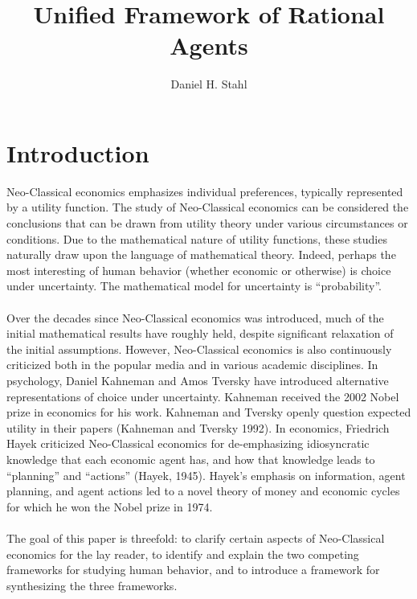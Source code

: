 \documentclass{article}
\theoremstyle{definition}
\begin{document}
	
	
\title{Unified Framework of Rational Agents}
\date{}
\author{Daniel H. Stahl}

\section{Introduction}

Neo-Classical economics emphasizes individual preferences, typically represented by a utility function.  The study of Neo-Classical economics can be considered the conclusions that can be drawn from utility theory under various circumstances or conditions.  Due to the mathematical nature of utility functions, these studies naturally draw upon the language of mathematical theory.  Indeed, perhaps the most interesting of human behavior (whether economic or otherwise) is choice under uncertainty.  The mathematical model for uncertainty is ``probability''.  
\\
\\
Over the decades since Neo-Classical economics was introduced, much of the initial mathematical results have roughly held, despite significant relaxation of the initial assumptions.  However, Neo-Classical economics is also continuously criticized both in the popular media and in various academic disciplines.  In psychology, Daniel Kahneman and Amos Tversky have introduced alternative representations of choice under uncertainty.  Kahneman received the 2002 Nobel prize in economics for his work.  Kahneman and Tversky openly question expected utility in their papers (Kahneman and Tversky 1992).  In economics, Friedrich Hayek criticized Neo-Classical economics for de-emphasizing idiosyncratic knowledge that each economic agent has, and how that knowledge leads to ``planning'' and ``actions'' (Hayek, 1945).  Hayek's emphasis on information, agent planning, and agent actions led to a novel theory of money and economic cycles for which he won the Nobel prize in 1974.  
\\
\\
The goal of this paper is threefold: to clarify certain aspects of Neo-Classical economics for the lay reader, to identify and explain the two competing frameworks for studying human behavior, and to introduce a framework for synthesizing the three frameworks.  
\end{document}
